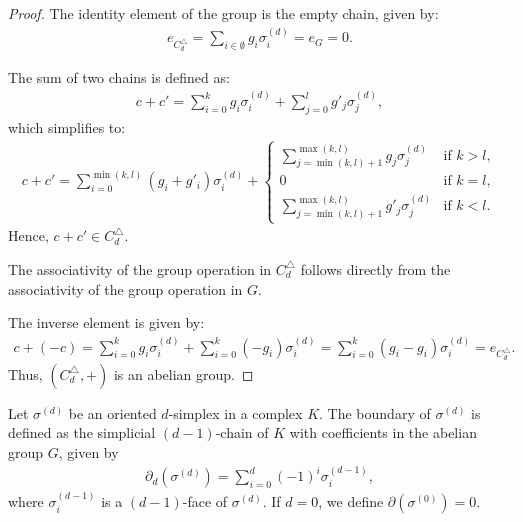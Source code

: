 \begin{proof}
	The identity element of the group is the empty chain, given by:
	\begin{align}
		e_{C^{\triangle}_d} = \sum_{i \in \emptyset} g_{i} \sigma_{i}^{(d)} = e_{G} = 0. 
	\end{align}
				
	The sum of two chains is defined as:
	\begin{align}
		c + c' = \sum_{i=0}^{k} g_{i} \sigma_{i}^{(d)} + \sum_{j=0}^{l} g'_{j} \sigma_{j}^{(d)}, 
	\end{align}
	which simplifies to:
	\begin{align}
		c + c' = \sum_{i=0}^{\min(k, l)} (g_{i} + g'_{i}) \sigma_{i}^{(d)} + 
		\begin{cases}
		\sum_{j=\min(k, l)+1}^{\max(k, l)} g_{j} \sigma_{j}^{(d)}  & \text{if } k > l, \\
		0                                                          & \text{if } k = l, \\
		\sum_{j=\min(k, l)+1}^{\max(k, l)} g'_{j} \sigma_{j}^{(d)} & \text{if } k < l. 
		\end{cases}
	\end{align}
	Hence, \( c + c' \in C^{\triangle}_{d} \).
				
	The associativity of the group operation in \( C^{\triangle}_{d} \) follows directly from
	the associativity of the group operation in \( G \).
				
	The inverse element is given by:
	\begin{align}
		c + (-c) = \sum_{i=0}^{k} g_{i} \sigma_{i}^{(d)} + \sum_{i=0}^{k} (-g_{i}) \sigma_{i}^{(d)} = \sum_{i=0}^{k} (g_{i} - g_{i}) \sigma_{i}^{(d)} = e_{C^{\triangle}_d}. 
	\end{align}
	Thus, \( (C^{\triangle}_{d}, +) \) is an abelian group.
\end{proof}

\begin{definition}[Boundary]{\cite[\S 2, p. 106]{hatcher2005algebraic}} 
	Let \( \sigma^{(d)} \) be an oriented \( d \)-simplex in a complex \( K \). The boundary of \( \sigma^{(d)} \) is defined as the simplicial \( (d-1) \)-chain of \( K \) with coefficients in the abelian group \( G \), given by
	\begin{align}
		\partial_d(\sigma^{(d)}) = \sum_{i=0}^{d} (-1)^{i} \sigma^{(d-1)}_{i}, 
	\end{align}
	where \( \sigma^{(d-1)}_{i} \) is a \( (d-1) \)-face of \( \sigma^{(d)} \). If \( d = 0 \), we define \( \partial(\sigma^{(0)}) = 0 \).
\end{definition}

